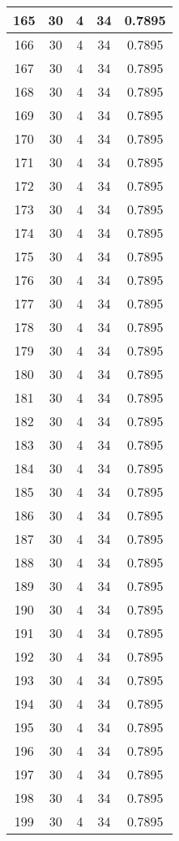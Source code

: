 \documentclass[letterpaper, 12pt]{article}
\begin{document}
\begin{longtable}{|c|c|c|c|c|}
\hline
165 & 30 & 4 & 34 & 0.7895 \\
\hline
166 & 30 & 4 & 34 & 0.7895 \\
\hline
167 & 30 & 4 & 34 & 0.7895 \\
\hline
168 & 30 & 4 & 34 & 0.7895 \\
\hline
169 & 30 & 4 & 34 & 0.7895 \\
\hline
170 & 30 & 4 & 34 & 0.7895 \\
\hline
171 & 30 & 4 & 34 & 0.7895 \\
\hline
172 & 30 & 4 & 34 & 0.7895 \\
\hline
173 & 30 & 4 & 34 & 0.7895 \\
\hline
174 & 30 & 4 & 34 & 0.7895 \\
\hline
175 & 30 & 4 & 34 & 0.7895 \\
\hline
176 & 30 & 4 & 34 & 0.7895 \\
\hline
177 & 30 & 4 & 34 & 0.7895 \\
\hline
178 & 30 & 4 & 34 & 0.7895 \\
\hline
179 & 30 & 4 & 34 & 0.7895 \\
\hline
180 & 30 & 4 & 34 & 0.7895 \\
\hline
181 & 30 & 4 & 34 & 0.7895 \\
\hline
182 & 30 & 4 & 34 & 0.7895 \\
\hline
183 & 30 & 4 & 34 & 0.7895 \\
\hline
184 & 30 & 4 & 34 & 0.7895 \\
\hline
185 & 30 & 4 & 34 & 0.7895 \\
\hline
186 & 30 & 4 & 34 & 0.7895 \\
\hline
187 & 30 & 4 & 34 & 0.7895 \\
\hline
188 & 30 & 4 & 34 & 0.7895 \\
\hline
189 & 30 & 4 & 34 & 0.7895 \\
\hline
190 & 30 & 4 & 34 & 0.7895 \\
\hline
191 & 30 & 4 & 34 & 0.7895 \\
\hline
192 & 30 & 4 & 34 & 0.7895 \\
\hline
193 & 30 & 4 & 34 & 0.7895 \\
\hline
194 & 30 & 4 & 34 & 0.7895 \\
\hline
195 & 30 & 4 & 34 & 0.7895 \\
\hline
196 & 30 & 4 & 34 & 0.7895 \\
\hline
197 & 30 & 4 & 34 & 0.7895 \\
\hline
198 & 30 & 4 & 34 & 0.7895 \\
\hline
199 & 30 & 4 & 34 & 0.7895 \\
\hline
\end{longtable}
\end{document}
